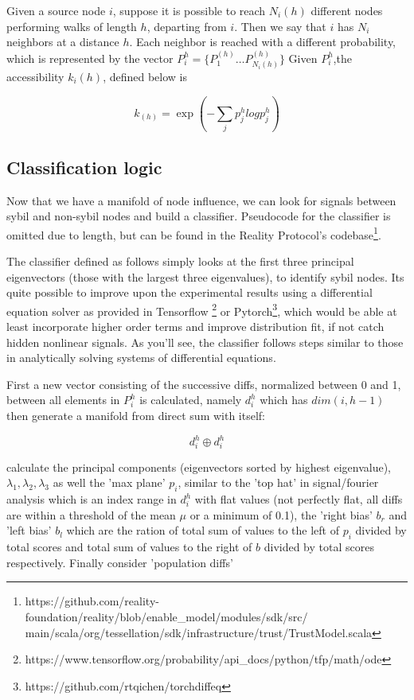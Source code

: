 \documentclass{article}
\theoremstyle{definition}
\theoremstyle{remark}
\theoremstyle{plain}
\begin{document}
Given a source node $i$, suppose it is possible to reach $N_i(h)$ different nodes performing walks of length $h$, departing from $i$. Then we say that $i$ has $N_i$ neighbors at a distance $h$. Each neighbor is reached with a different probability, which is represented by the vector $P_i^h = \{ P_1^{(h)} \dots P_{N_i(h)}^{(h)} \}$ Given $P_i^h$,the accessibility $k_i(h)$, defined below is 
	
	
\begin{equation}
k_(h) = \exp (-\sum_j p^{h}_j log p^{h}_j )
\end{equation}

\subsection{Classification logic}
Now  that we have a manifold of node influence, we can look for signals between sybil and non-sybil nodes and build a classifier. Pseudocode for the classifier is omitted due to length, but can be found in the Reality Protocol's codebase\footnote{https://github.com/reality-foundation/reality/blob/enable\_model/modules/sdk/src/\\main/scala/org/tessellation/sdk/infrastructure/trust/TrustModel.scala}.

The classifier defined as follows simply looks at the first three principal eigenvectors (those with the largest three eigenvalues), to identify sybil nodes. Its quite possible to improve upon the experimental results using a differential equation solver as provided in Tensorflow \footnote{https://www.tensorflow.org/probability/api\_docs/python/tfp/math/ode} or Pytorch\footnote{https://github.com/rtqichen/torchdiffeq}, which would be able at least incorporate higher order terms and improve distribution fit, if not catch hidden nonlinear signals. As you'll see, the classifier follows steps similar to those in analytically solving systems of differential equations.

First a new vector consisting of the successive diffs, normalized between 0 and 1, between all elements in $P_i^h$ is calculated, namely $d_i^h$ which has $dim(i, h-1)$ then generate a manifold from direct sum with itself:

\begin{equation}
d_i^h \oplus d_i^h
\end{equation}

calculate the principal components (eigenvectors sorted by highest eigenvalue), $\lambda_1, \lambda_2 ,\lambda_3$ as well the 'max plane' $p_i$, similar to the 'top hat' in signal/fourier analysis which is an index range in $d_i^h$ with flat values (not perfectly flat, all diffs are within a threshold of the mean $\mu$ or a minimum of 0.1), the 'right bias' $b_r$ and 'left bias' $b_l$ which are the ration of total sum of values to the left of $p_i$ divided by total scores and  total sum of values to the right of $b$ divided by total scores respectively. Finally consider 'population diffs' 
\end{document}

